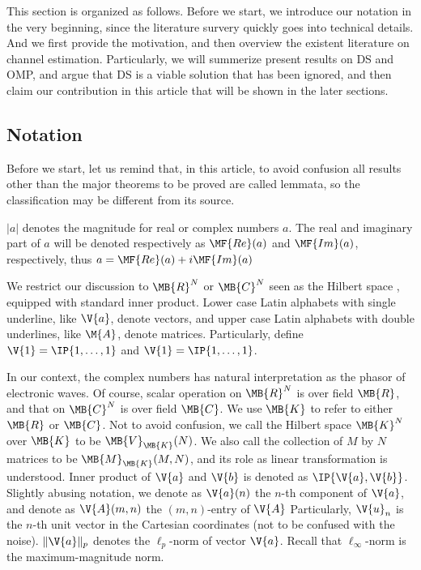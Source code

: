 
This section is organized as follows.
Before we start, we introduce our notation in the very beginning, since the literature survery quickly goes into technical details.
And we first provide the motivation, and then overview the existent literature on channel estimation.
Particularly, we will summerize present results on DS and OMP, and argue that DS is a viable solution that has been ignored, and then claim our contribution in this article that will be shown in the later sections.

\subsection{Notation}

Before we start, let us remind that, in this article, to avoid confusion all results other than the major theorems to be proved are called lemmata, so the classification may be different from its source.

\(|a|\) denotes the magnitude for real or complex numbers \(a\).
The real and imaginary part of \(a\) will be denoted respectively as \(\MF{Re} (a)\) and \(\MF{Im} (a)\), respectively, thus \(a =\MF{Re} (a) + i \MF{Im} (a)\)

We restrict our discussion to \(\MB{R}^N\) or \(\MB{C}^N\) seen as the Hilbert space , equipped with standard inner product.
Lower case Latin alphabets with single underline, like \(\V{a}\), denote vectors, and upper case Latin alphabets with double underlines, like \(\M{A}\), denote matrices.
Particularly, define \(\V{1} =\IP{ 1, \dotsc, 1 }\) and \(\V{1} =\IP{ 1, \dotsc, 1 }\).

In our context, the complex numbers has natural interpretation as the phasor of electronic waves.
Of course, scalar operation on \(\MB{R}^N\) is over field \(\MB{R}\), and that on \(\MB{C}^N\) is over field \(\MB{C}\).
We use \(\MB{K}\) to refer to either \(\MB{R}\) or \(\MB{C}\).
Not to avoid confusion, we call the Hilbert space \(\MB{K}^N\) over \(\MB{K}\) to be \(\MB{V}_{\MB{K}} (N)\).
We also call the collection of \(M\) by \(N\) matrices to be \(\MB{M}_{\MB{K}} (M,N)\), and its role as linear transformation is understood.
Inner product of \(\V{a}\) and \(\V{b}\) is denoted as \(\IP{ \V{a}, \V{b} }\).
Slightly abusing notation, we denote as \(\V{a} (n)\) the \(n\)-th component of \(\V{a}\), and denote as \(\V{A} (m,n)\) the \((m,n)\)-entry of \(\V{A}\)
Particularly, \(\V{u}_n\) is the \(n\)-th unit vector in the Cartesian coordinates (not to be confused with the noise).
\(\|\V{a}\|_p\) denotes the \(\ell_p\)-norm of vector \(\V{a}\).
Recall that \(\ell_\infty\)-norm is the maximum-magnitude norm.


